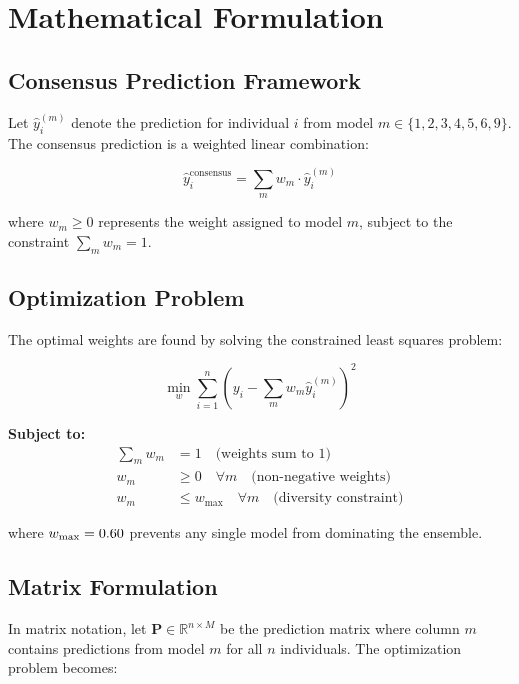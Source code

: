 \section{Mathematical Formulation}

\subsection{Consensus Prediction Framework}

Let $\hat{y}_i^{(m)}$ denote the prediction for individual $i$ from model $m \in \{1, 2, 3, 4, 5, 6, 9\}$. The consensus prediction is a weighted linear combination:

\begin{equation}
\hat{y}_i^{\text{consensus}} = \sum_{m} w_m \cdot \hat{y}_i^{(m)}
\end{equation}

where $w_m \geq 0$ represents the weight assigned to model $m$, subject to the constraint $\sum_m w_m = 1$.

\subsection{Optimization Problem}

The optimal weights are found by solving the constrained least squares problem:

\begin{equation}
\min_{w} \sum_{i=1}^{n} \left( y_i - \sum_{m} w_m \hat{y}_i^{(m)} \right)^2
\end{equation}

\textbf{Subject to:}
\begin{align}
\sum_{m} w_m &= 1 \quad \text{(weights sum to 1)} \\
w_m &\geq 0 \quad \forall m \quad \text{(non-negative weights)} \\
w_m &\leq w_{\max} \quad \forall m \quad \text{(diversity constraint)}
\end{align}

where $w_{\max} = 0.60{}$ prevents any single model from dominating the ensemble.

\subsection{Matrix Formulation}

In matrix notation, let $\mathbf{P} \in \mathbb{R}^{n \times M}$ be the prediction matrix where column $m$ contains predictions from model $m$ for all $n$ individuals. The optimization problem becomes:

